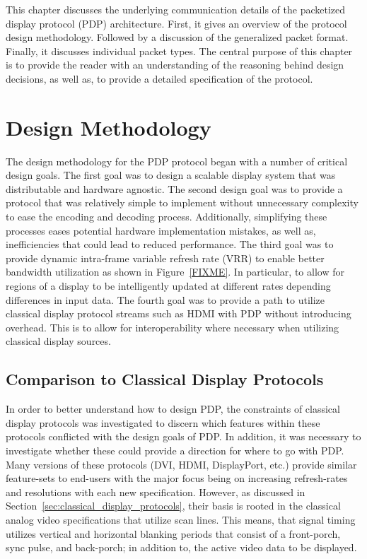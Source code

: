 \label{chap:pdp_protocol}

This chapter discusses the underlying communication details of the packetized display protocol (PDP) architecture. First, it gives an overview of the protocol design methodology. Followed by a discussion of the generalized packet format. Finally, it discusses individual packet types. The central purpose of this chapter is to provide the reader with an understanding of the reasoning behind design decisions, as well as, to provide a detailed specification of the protocol.

\section{Design Methodology}


    The design methodology for the PDP protocol began with a number of critical design goals. The first goal was to design a scalable display system that was distributable and hardware agnostic. The second design goal was to provide a protocol that was relatively simple to implement without unnecessary complexity to ease the encoding and decoding process. Additionally, simplifying these processes eases potential hardware implementation mistakes, as well as, inefficiencies that could lead to reduced performance. The third goal was to provide dynamic intra-frame variable refresh rate (VRR) to enable better bandwidth utilization as shown in Figure~\ref{FIXME}. In particular, to allow for regions of a display to be intelligently updated at different rates depending differences in input data. The fourth goal was to provide a path to utilize classical display protocol streams such as HDMI with PDP without introducing overhead. This is to allow for interoperability where necessary when utilizing classical display sources.

    \subsection{Comparison to Classical Display Protocols}

        In order to better understand how to design PDP, the constraints of classical display protocols was investigated to discern which features within these protocols conflicted with the design goals of PDP. In addition, it was necessary to investigate whether these could provide a direction for where to go with PDP. Many versions of these protocols (DVI\cite{DDWG1999}, HDMI\cite{HDMIForum2018}, DisplayPort\cite{VESA2016}, etc.) provide similar feature-sets to end-users with the major focus being on increasing refresh-rates and resolutions with each new specification. However, as discussed in Section~\ref{sec:classical_display_protocols}, their basis is rooted in the classical analog video specifications that utilize scan lines\cite{Neal1998}. This means, that signal timing utilizes vertical and horizontal blanking periods that consist of a front-porch, sync pulse, and back-porch; in addition to, the active video data to be displayed.

